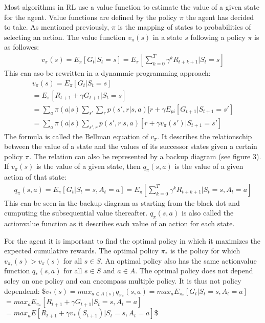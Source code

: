 \documentclass[letterpaper,10pt,english]{jupyterBook}
\begin{document}
\sphinxAtStartPar
Most algorithms in RL use a value function to estimate the value of a given state for the agent. Value functions are defined by the policy \(\pi\) the agent has decided to take. As mentioned previously, \(\pi\) is the mapping of states to probabilities of selecting an action. The value function \(v_{\pi}(s)\) in a state \(s\) following a policy \(\pi\) is as followes:
\begin{equation*}
\begin{split} v_{\pi}(s) = E_{\pi}[G_t | S_t = s] = E_{\pi}[\sum_{k=0}^T \gamma^kR_{t+k+1} | S_t=s] \end{split}
\end{equation*}
\sphinxAtStartPar
This can aso be rewritten in a dynammic programming approach:
\begin{gather*} v_{\pi}(s) = E_{\pi}[G_t | S_t = s] \\ 
 = E_{\pi}[R_{t+1} + \gamma G_{t+1} | S_t = s] \\
 = \sum_a \pi(a|s) \sum_{s'} \sum_r p(s', r|s,a)[r + \gamma E_{pi}[G_{t+1} | S_{t+1} = s'] \\
 = \sum_a \pi(a|s) \sum_{s', r}p(s', r|s,a)[r + \gamma v_{\pi}(s')| S_{t+1} = s'] \end{gather*}
\sphinxAtStartPar
The formula is called the Bellman equation of \(v_{\pi}\). It describes the relationschip between the value of a state and the values of its successor states given a certain policy \(\pi\). The relation can also be represented by a backup diagram (see figure 3). If \(v_{\pi}(s)\) is the value of a given state, then \(q_{\pi}(s,a)\) is the value of a given action of that state:
\begin{equation*}
\begin{split} q_{\pi}(s,a) = E_{\pi}[G_t | S_t = s, A_t = a] = E_{\pi}[\sum_{k=0}^T \gamma^kR_{t+k+1} | S_t=s, A_t = a] \end{split}
\end{equation*}
\sphinxAtStartPar
This can be seen in the backup diagram as starting from the black dot and cumputing the subsequential value thereafter. \(q_{\pi}(s,a)\) is also called the action\sphinxhyphen{}value function as it describes each value of an action for each state.

\sphinxAtStartPar
{}

\sphinxAtStartPar
For the agent it is important to find the optimal policy in which it maximizes the expected cumulative rewards. The optimal policy \(\pi_*\) is the policy for which \(v_{\pi_*}(s) > v_{\pi}(s)\) for all \(s \in S\). An optimal policy also has the same action\sphinxhyphen{}value function \(q_*(s,a)\) for all \(s \in S\) and \(a \in A\). The optimal policy does not depend soley on one policy and can encompass multiple policy. It is thus not policy dependend:
\$\( v_*(s) = max_{a \in A(s)} q_{\pi_*}(s,a) \)\(
\)\( = max_{a} E_{\pi_*}[G_t | S_t=s, A_t=a] \)\( 
\)\( = max_{a} E_{\pi_*}[R_{t+1} + \gamma G_{t+1} | S_t=s, A_t=a] \)\(
\)\( = max_{a} E[R_{t+1} + \gamma v_*(S_{t+1}) | S_t=s, A_t=a] \)\$
\end{document}
